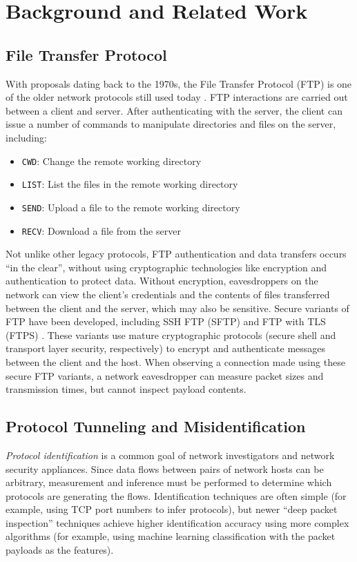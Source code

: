 \documentclass[letterpaper,twocolumn,11pt]{article}
\begin{document}
\section{Background and Related Work} \label{sec:background}

\subsection{File Transfer Protocol}

With proposals dating back to the 1970s, the File Transfer Protocol (FTP) is
one of the older network protocols still used today \cite{ftprfc}. FTP
interactions are carried out between a client and server. After
authenticating with the server, the client can issue a number of commands to
manipulate directories and files on the server, including:

\begin{itemize}
  \item \texttt{CWD}: Change the remote working directory
  \item \texttt{LIST}: List the files in the remote working directory
  \item \texttt{SEND}: Upload a file to the remote working directory
  \item \texttt{RECV}: Download a file from the server
\end{itemize}

Not unlike other legacy protocols, FTP authentication and data transfers occurs
``in the clear'', without using cryptographic technologies like encryption and
authentication to protect data. Without encryption, eavesdroppers on the
network can view the client's credentials and the contents of files transferred
between the client and the server, which may also be sensitive. Secure variants
of FTP have been developed, including SSH FTP (SFTP) and FTP with TLS (FTPS)
\cite{sftp-draft, ftpsrfc}. These variants use mature cryptographic protocols
(secure shell and transport layer security, respectively) to encrypt and
authenticate messages between the client and the host. When observing a
connection made using these secure FTP variants, a network eavesdropper can
measure packet sizes and transmission times, but cannot inspect payload
contents.

\subsection{Protocol Tunneling and Misidentification}

\emph{Protocol identification} is a common goal of network investigators and
network security appliances. Since data flows between pairs of network hosts
can be arbitrary, measurement and inference must be performed to determine
which protocols are generating the flows. Identification techniques are often
simple (for example, using TCP port numbers to infer protocols), but newer
``deep packet inspection'' techniques achieve higher identification accuracy
using more complex algorithms (for example, using machine learning
classification with the packet payloads as the features).
\end{document}
